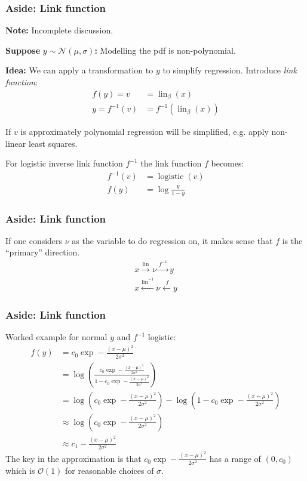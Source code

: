 \documentclass[usenames,dvipsnames,table]{beamer}
\begin{document}
\begin{frame}
\frametitle{Aside: Link function}
\textbf{Note:} Incomplete discussion.

\textbf{Suppose} $y\sim\mathcal{N}(\mu, \sigma)$\textbf{:} Modelling the pdf is non-polynomial.

\textbf{Idea:} We can apply a transformation to $y$ to simplify regression. Introduce \emph{link function}:
\begin{align*}
f(y) = v      &= \operatorname{lin}_\beta(x) \\
y = f^{-1}(v) &= f^{-1}(\operatorname{lin}_\beta(x))
\end{align*}

If $v$ is approximately polynomial regression will be simplified, e.g. apply non-linear least squares.

For logistic inverse link function $f^{-1}$ the link function $f$ becomes:
\begin{align*}
f^{-1}(v) &= \operatorname{logistic}(v) \\
f(y)      &= \log \frac{y}{1 - y}
\end{align*}
\end{frame}

\begin{frame}
\frametitle{Aside: Link function}

If one considers $\nu$ as the variable to do regression on, it makes sense that $f$ is the ``primary'' direction.
\begin{align*}
x \overset{\operatorname{lin}}\rightarrow \nu \overset{f^{-1}}\rightarrow y \\
x \overset{\operatorname{lin}^{-1}}\leftarrow \nu \overset{\ f}\leftarrow y 
\end{align*}
\end{frame}

\begin{frame}
\frametitle{Aside: Link function}
Worked example for normal $y$ and $f^{-1}$ logistic:
\vspace{-1em}
\begin{align*}
f(y) &= c_0 \exp - \frac{(x - \mu)^2}{2\sigma^2} \\
     &= \log\left(\frac{c_0 \exp - \frac{(x - \mu)^2}{2\sigma^2}}{1-c_0 \exp - \frac{(x - \mu)^2}{2\sigma^2}}\right) \\
     &= \log\left(c_0 \exp - \frac{(x - \mu)^2}{2\sigma^2}\right) -
        \log\left(1-c_0 \exp - \frac{(x - \mu)^2}{2\sigma^2}\right)\\
     &\approx \log\left(c_0 \exp - \frac{(x - \mu)^2}{2\sigma^2}\right)\\
     &\approx c_1 - \frac{(x - \mu)^2}{2\sigma^2}
\end{align*}
The key in the approximation is that $c_0 \exp - \frac{(x - \mu)^2}{2\sigma^2}$ has a range of $(0, c_0)$ which is $\mathcal{O}(1)$ for reasonable choices of $\sigma$.
\end{frame}
\end{document}
